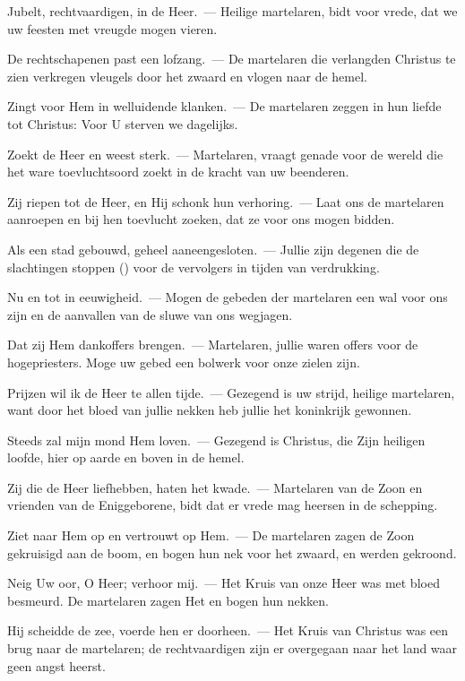\documentclass[12pt,twoside,a5paper]{article}
\begin{document}
\begin{halfparskip}
  Jubelt, rechtvaardigen, in de Heer.~--- Heilige martelaren, bidt voor vrede, dat we uw feesten met vreugde mogen vieren.

  De rechtschapenen past een lofzang.~--- De martelaren die verlangden Christus te zien verkregen vleugels door het zwaard en vlogen naar de hemel.

  Zingt voor Hem in welluidende klanken.~--- De martelaren zeggen in hun liefde tot Christus: Voor U sterven we dagelijks.

  Zoekt de Heer en weest sterk.~--- Martelaren, vraagt genade voor de wereld die het ware toevluchtsoord zoekt in de kracht van uw beenderen.

  Zij riepen tot de Heer, en Hij schonk hun verhoring.~--- Laat ons de martelaren aanroepen en bij hen toevlucht zoeken, dat ze voor ons mogen bidden.

  Als een stad gebouwd, geheel aaneengesloten.~--- Jullie zijn degenen die de slachtingen stoppen () voor de vervolgers in tijden van verdrukking.

  Nu en tot in eeuwigheid.~--- Mogen de gebeden der martelaren een wal voor ons zijn en de aanvallen van de sluwe van ons wegjagen.

  Dat zij Hem dankoffers brengen.~--- Martelaren, jullie waren offers voor de hogepriesters. Moge uw gebed een bolwerk voor onze zielen zijn.

  Prijzen wil ik de Heer te allen tijde.~--- Gezegend is uw strijd, heilige martelaren, want door het bloed van jullie nekken heb jullie het koninkrijk gewonnen.

  Steeds zal mijn mond Hem loven.~--- Gezegend is Christus, die Zijn heiligen loofde, hier op aarde en boven in de hemel.

  Zij die de Heer liefhebben, haten het kwade.~--- Martelaren van de Zoon en vrienden van de Eniggeborene, bidt dat er vrede mag heersen in de schepping.

  Ziet naar Hem op en vertrouwt op Hem.~--- De martelaren zagen de Zoon gekruisigd aan de boom, en bogen hun nek voor het zwaard, en werden gekroond.

  Neig Uw oor, O Heer; verhoor mij.~--- Het Kruis van onze Heer was met bloed besmeurd. De martelaren zagen Het en bogen hun nekken.

  Hij scheidde de zee, voerde hen er doorheen.~--- Het Kruis van Christus was een brug naar de martelaren; de rechtvaardigen zijn er overgegaan naar het land waar geen angst heerst.


\end{halfparskip}
\end{document}
